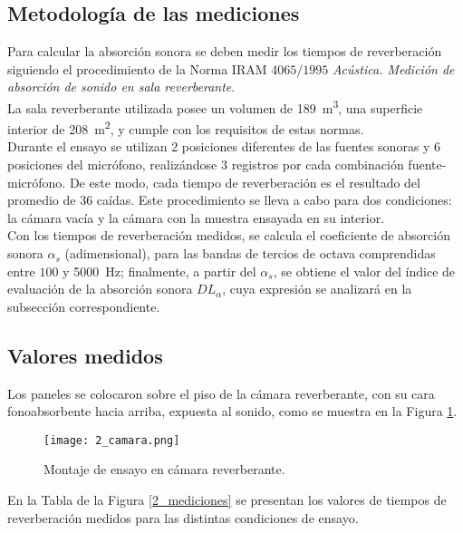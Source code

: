 		\subsection{Metodología de las mediciones}
			
		Para calcular la absorción sonora se deben medir los tiempos de reverberación siguiendo el procedimiento de la Norma IRAM $4065/1995$ \textit{Acústica. Medición de absorción de sonido en sala reverberante}.\\

		La sala reverberante utilizada posee un volumen de \SI{189}{\cubic\meter}, una superficie interior de \SI{208}{\square\meter}, y cumple con los requisitos de estas normas.\\

		Durante el ensayo se utilizan 2 posiciones diferentes de las fuentes sonoras y 6 posiciones del micrófono, realizándose 3 registros por cada combinación fuente-micrófono. De este modo, cada tiempo de reverberación es el resultado del promedio de 36 caídas. Este procedimiento se lleva a cabo para dos condiciones: la cámara vacía y la cámara con la muestra ensayada en su interior.\\

		Con los tiempos de reverberación medidos, se calcula el coeficiente de absorción sonora \texttt{$\alpha_s$} (adimensional), para las bandas de tercios de octava comprendidas entre $100$ y \SI{5000}{\Hz}; finalmente, a partir del \texttt{$\alpha_s$}, se obtiene el valor del índice de evaluación de la absorción sonora \texttt{$DL_{\alpha}$}, cuya expresión se analizará en la subsección correspondiente.
		
		\subsection{Valores medidos}
		
		Los paneles se colocaron sobre el piso de la cámara reverberante, con su cara fonoabsorbente hacia arriba, expuesta al sonido, como se muestra en la Figura \ref{2_camara}.\\
		
		\begin{figure}[H]
			\centering
			\texttt{[image: 2\_camara.png]}\\
			\caption{Montaje de ensayo en cámara reverberante.}
			\label{2_camara}
		\end{figure}
		
		En la Tabla de la Figura \ref{2_mediciones} se presentan los valores de tiempos de reverberación medidos para las distintas condiciones de ensayo.\\
		
